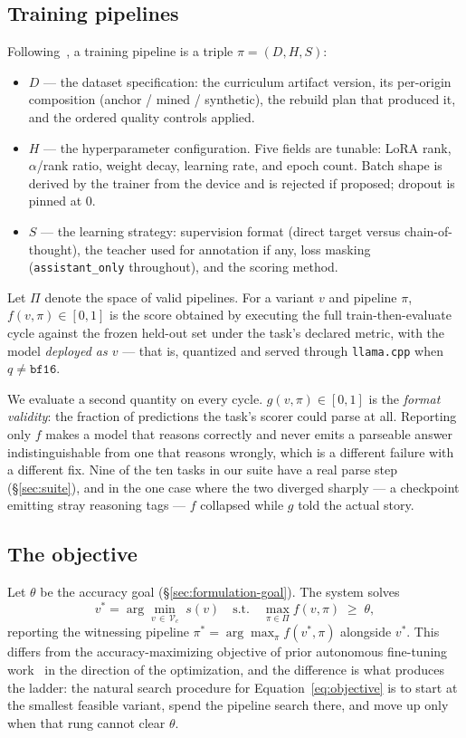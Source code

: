 \documentclass[sigconf,10pt]{acmart}
\newcommand{\xref}[1]{\S\ref{#1}}
\newcommand{\squishlist}{\begin{itemize}[itemsep=1pt,parsep=2pt,topsep=3pt,partopsep=0pt,leftmargin=0em,itemindent=1em,labelwidth=1em,labelsep=0.5em]}
\newcommand{\squishend}{\end{itemize}}
\begin{document}
\subsection{Training pipelines}

Following~\cite{atreja2026pioneer}, a training pipeline is a triple $\pi = (D, H, S)$:
\squishlist
\item $D$ --- the dataset specification: the curriculum artifact version, its per-origin
composition (anchor / mined / synthetic), the rebuild plan that produced it, and the ordered
quality controls applied.
\item $H$ --- the hyperparameter configuration. Five fields are tunable: LoRA rank,
$\alpha$/rank ratio, weight decay, learning rate, and epoch count. Batch shape is derived by
the trainer from the device and is rejected if proposed; dropout is pinned at $0$.
\item $S$ --- the learning strategy: supervision format (direct target versus
chain-of-thought), the teacher used for annotation if any, loss masking
(\texttt{assistant\_only} throughout), and the scoring method.
\squishend
Let $\Pi$ denote the space of valid pipelines. For a variant $v$ and pipeline $\pi$,
$f(v,\pi) \in [0,1]$ is the score obtained by executing the full train-then-evaluate cycle
against the frozen held-out set under the task's declared metric, with the model
\emph{deployed as $v$} --- that is, quantized and served through \texttt{llama.cpp} when
$q \ne \texttt{bf16}$.

We evaluate a second quantity on every cycle. $g(v,\pi) \in [0,1]$ is the \emph{format
validity}: the fraction of predictions the task's scorer could parse at all. Reporting only
$f$ makes a model that reasons correctly and never emits a parseable answer
indistinguishable from one that reasons wrongly, which is a different failure with a
different fix. Nine of the ten tasks in our suite have a real parse step
(\xref{sec:suite}), and in the one case where the two diverged sharply --- a checkpoint
emitting stray reasoning tags --- $f$ collapsed while $g$ told the actual story.

\subsection{The objective}
\label{sec:formulation-objective}

Let $\theta$ be the accuracy goal (\xref{sec:formulation-goal}). The system solves
\begin{equation}
v^{*} = \arg\min_{v \,\in\, \mathcal{V}_c} \; s(v)
\quad \text{s.t.} \quad \max_{\pi \in \Pi} f(v, \pi) \;\ge\; \theta ,
\label{eq:objective}
\end{equation}
reporting the witnessing pipeline $\pi^{*} = \arg\max_{\pi} f(v^{*},\pi)$ alongside $v^{*}$.
This differs from the accuracy-maximizing objective of prior autonomous fine-tuning
work~\cite{atreja2026pioneer} in the direction of the optimization, and the difference is
what produces the ladder: the natural search procedure for
Equation~\ref{eq:objective} is to start at the smallest feasible variant, spend the pipeline
search there, and move up only when that rung cannot clear $\theta$.
\end{document}
